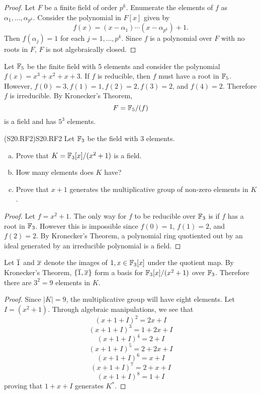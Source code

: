 \documentclass[../AlgebraQualSolutions.tex]{subfiles}
\begin{document}
\begin{proof}
	Let $F$ be a  finite field of order $p^k$. Enumerate the elements of $f$ as $\alpha_1,\ldots, \alpha_{p^k}$. Consider the polynomial in $F[x]$ given by 
		\[f(x) = (x-\alpha_1)\cdots (x-\alpha_{p^k}) + 1.\]
	Then $f(\alpha_j) = 1$ for each $j = 1,\ldots,p^k$. Since $f$ is a polynomial over $F$ with no roots in $F$, $F$ is not algebraically closed.
\end{proof}

\begin{solution}
	Let $\mathbb{F}_5$ be the finite field with 5 elements and consider the polynomial $f(x) = x^3 + x^2 + x + 3$. If $f$ is reducible, then $f$ must have a root in $\mathbb{F}_5$. However, $f(0) = 3, f(1) = 1, f(2) = 2, f(3) = 2$, and $f(4) = 2$. Therefore $f$ is irreducible. By Kronecker's Theorem,
		\[F = \mathbb{F}_5/(f)\]
	is a field and has $5^3$ elements.
\end{solution}

\begin{prob}{(S20.RF2)}{S20.RF2}
Let $\mathbb{F}_3$ be the field with 3 elements.
\begin{enumerate}[(a)]
\item Prove that $K = \mathbb{F}_3[x]/(x^2 + 1)$ is a field.
\item How many elements does $K$ have?
\item Prove that $x+1$ generates the multiplicative group of non-zero elements in $K$.
\end{enumerate}
\end{prob}

\begin{proof}
	Let $f = x^2 + 1$. The only way for $f$ to be reducible over $\mathbb{F}_3$ is if $f$ has a root in $\mathbb{F}_3$. However this is impossible since $f(0) = 1$, $f(1) = 2$, and $f(2) = 2$. By Kronecker's Theorem, a polynomial ring quotiented out by an ideal generated by an irreducible polynomial is a field.
\end{proof}

\begin{solution}
	Let $\overline{1}$ and $\overline{x}$ denote the images of $1,x \in \mathbb{F}_3[x]$ under the quotient map. By Kronecker's Theorem, $\{\overline{1},\overline{x}\}$ form a basis for $\mathbb{F}_3[x]/(x^2 + 1)$ over $\mathbb{F}_3$. Therefore there are $3^2 = 9$ elements in $K$.
\end{solution}

\begin{proof}
	Since $|K| = 9$, the multiplicative group will have eight elements. Let $I = (x^2 + 1)$. Through algebraic manipulations, we see that 
		\[(x+1+I)^2 = 2x + I\]
		\[(x+1+I)^3 = 1 + 2x + I\]
		\[(x+1+I)^4 = 2 + I\]
		\[(x+1+I)^5 = 2 + 2x + I\]
		\[(x+1+I)^6 = x + I\]
		\[(x+1+I)^7 = 2 + x + I\]
		\[(x+1+I)^8 = 1 + I\]
	proving that $1 + x + I$ generates $K^*$.
\end{proof}
\end{document}
